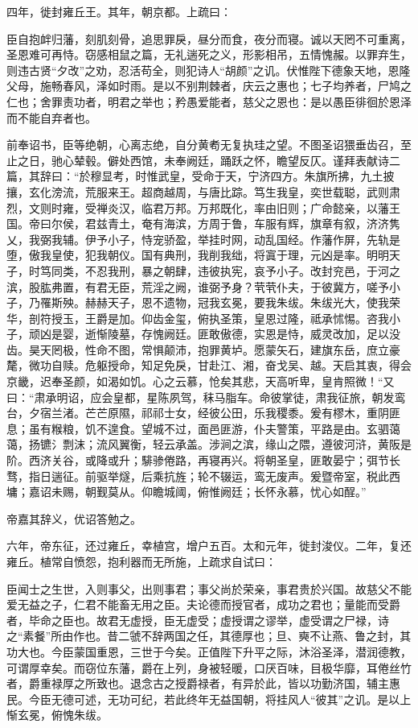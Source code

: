 \documentclass[12pt,UTF8]{ctexbook}
\begin{document}
四年，徙封雍丘王。其年，朝京都。上疏曰：

臣自抱衅归藩，刻肌刻骨，追思罪戾，昼分而食，夜分而寝。诚以天罔不可重离，圣恩难可再恃。窃感相鼠之篇，无礼遄死之义，形影相吊，五情愧赧。以罪弃生，则违古贤“夕改”之劝，忍活苟全，则犯诗人“胡颜”之讥。伏惟陛下德象天地，恩隆父母，施畅春风，泽如时雨。是以不别荆棘者，庆云之惠也；七子均养者，尸鸠之仁也；舍罪责功者，明君之举也；矜愚爱能者，慈父之恩也：是以愚臣徘徊於恩泽而不能自弃者也。

前奉诏书，臣等绝朝，心离志绝，自分黄耇无复执珪之望。不图圣诏猥垂齿召，至止之日，驰心辇毂。僻处西馆，未奉阙廷，踊跃之怀，瞻望反仄。谨拜表献诗二篇，其辞曰：“於穆显考，时惟武皇，受命于天，宁济四方。朱旗所拂，九土披攘，玄化滂流，荒服来王。超商越周，与唐比踪。笃生我皇，奕世载聪，武则肃烈，文则时雍，受禅炎汉，临君万邦。万邦既化，率由旧则；广命懿亲，以藩王国。帝曰尔侯，君兹青土，奄有海滨，方周于鲁，车服有辉，旗章有叙，济济隽乂，我弼我辅。伊予小子，恃宠骄盈，举挂时网，动乱国经。作藩作屏，先轨是堕，傲我皇使，犯我朝仪。国有典刑，我削我绌，将寘于理，元凶是率。明明天子，时笃同类，不忍我刑，暴之朝肆，违彼执宪，哀予小子。改封兖邑，于河之滨，股肱弗置，有君无臣，荒淫之阙，谁弼予身？茕茕仆夫，于彼冀方，嗟予小子，乃罹斯殃。赫赫天子，恩不遗物，冠我玄冕，要我朱绂。朱绂光大，使我荣华，剖符授玉，王爵是加。仰齿金玺，俯执圣策，皇恩过隆，祗承怵惕。咨我小子，顽凶是婴，逝惭陵墓，存愧阙廷。匪敢傲德，实恩是恃，威灵改加，足以没齿。昊天罔极，性命不图，常惧颠沛，抱罪黄垆。愿蒙矢石，建旗东岳，庶立豪氂，微功自赎。危躯授命，知足免戾，甘赴江、湘，奋戈吴、越。天启其衷，得会京畿，迟奉圣颜，如渴如饥。心之云慕，怆矣其悲，天高听卑，皇肯照微！“又曰：“肃承明诏，应会皇都，星陈夙驾，秣马脂车。命彼掌徒，肃我征旅，朝发鸾台，夕宿兰渚。芒芒原隰，祁祁士女，经彼公田，乐我稷黍。爰有樛木，重阴匪息；虽有糇粮，饥不遑食。望城不过，面邑匪游，仆夫警策，平路是由。玄驷蔼蔼，扬镳氵剽沫；流风翼衡，轻云承盖。涉涧之滨，缘山之隈，遵彼河浒，黄阪是阶。西济关谷，或降或升；騑骖倦路，再寝再兴。将朝圣皇，匪敢晏宁；弭节长骛，指日遄征。前驱举燧，后乘抗旌；轮不辍运，鸾无废声。爰暨帝室，税此西墉；嘉诏未赐，朝觐莫从。仰瞻城阈，俯惟阙廷；长怀永慕，忧心如酲。”

帝嘉其辞义，优诏答勉之。

六年，帝东征，还过雍丘，幸植宫，增户五百。太和元年，徙封浚仪。二年，复还雍丘。植常自愤怨，抱利器而无所施，上疏求自试曰：

臣闻士之生世，入则事父，出则事君；事父尚於荣亲，事君贵於兴国。故慈父不能爱无益之子，仁君不能畜无用之臣。夫论德而授官者，成功之君也；量能而受爵者，毕命之臣也。故君无虚授，臣无虚受；虚授谓之谬举，虚受谓之尸禄，诗之“素餐”所由作也。昔二虢不辞两国之任，其德厚也；旦、奭不让燕、鲁之封，其功大也。今臣蒙国重恩，三世于今矣。正值陛下升平之际，沐浴圣泽，潜润德教，可谓厚幸矣。而窃位东藩，爵在上列，身被轻暖，口厌百味，目极华靡，耳倦丝竹者，爵重禄厚之所致也。退念古之授爵禄者，有异於此，皆以功勤济国，辅主惠民。今臣无德可述，无功可纪，若此终年无益国朝，将挂风人“彼其”之讥。是以上惭玄冕，俯愧朱绂。
\end{document}
